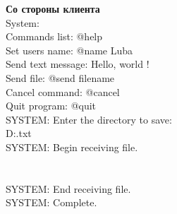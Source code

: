 \documentclass[12pt,a4paper]{article}
\begin{document}
\Large{\bf Со стороны клиента }
\\System:
\\Commands list: @help
\\Set users name: @name Luba
\\Send text message: Hello, world !
\\Send file: @send filename
\\Cancel command: @cancel
\\Quit program: @quit
\\SYSTEM: Enter the directory to save:
\\D:\textmessage.txt
\\SYSTEM: Begin receiving file.
\\
\\[\#\#\#\#\#.......]
\\SYSTEM: End receiving file.
\\SYSTEM: Complete.
\end{document}
